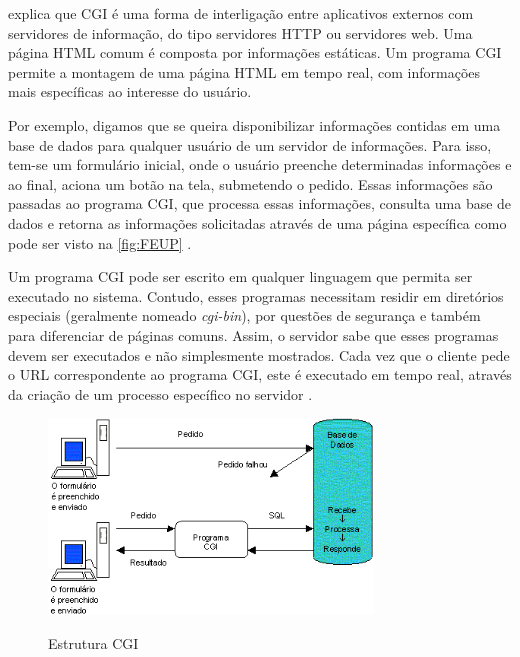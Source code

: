  explica que CGI é uma forma de interligação entre aplicativos externos com servidores de informação, do tipo servidores HTTP ou servidores web. Uma página HTML comum é composta por informações estáticas. Um programa CGI permite a montagem de uma página HTML em tempo real, com informações mais específicas ao interesse do usuário.

Por exemplo, digamos que se queira disponibilizar informações contidas em uma base de dados para qualquer usuário de um servidor de informações. Para isso, tem-se um formulário inicial, onde o usuário preenche determinadas informações e ao final, aciona um botão na tela, submetendo o pedido. Essas informações são passadas ao programa CGI, que processa essas informações, consulta uma base de dados e retorna as informações solicitadas através de uma página específica como pode ser visto na \autoref{fig:FEUP} \cite{apache:corte}.

Um programa CGI pode ser escrito em qualquer linguagem que permita ser executado no sistema. Contudo, esses programas necessitam residir em diretórios especiais (geralmente nomeado \textit{cgi-bin}), por questões de segurança e também para diferenciar de páginas comuns. Assim, o servidor sabe que esses programas devem ser executados e não simplesmente mostrados. Cada vez que o cliente pede o URL correspondente ao programa CGI, este é executado em tempo real, através da criação de um processo específico no servidor \cite{apache:corte}.

\begin{figure}[H]
    \centering
    \caption{Estrutura CGI}
    \includegraphics[width=0.77\textwidth]{./dados/figuras/fig11}
    \label{fig:FEUP}
\end{figure}